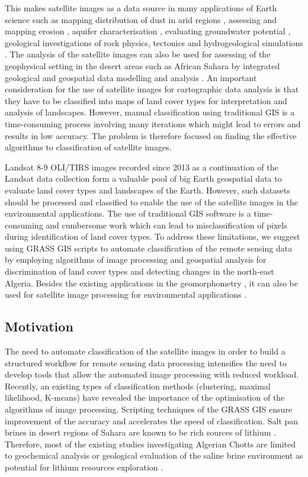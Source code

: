 \documentclass[asi,article,submit,pdftex,moreauthors]{Definitions/mdpi}
\begin{document}
This makes satellite images as a data source in many applications of Earth science such as mapping distribution of dust in arid regions \cite{Parajuli}, assessing and mapping erosion \cite{Mihi}, aquifer characterisation \cite{AOUDIA2020103920}, evaluating groundwater potential \cite{Derdour}, geological investigations of rock physics, tectonics and hydrogeological simulations \cite{NEDJRAOUI2021104348}. The analysis of the satellite images can also be used for assessing of the geophysical setting in the desert areas such as African Sahara by integrated geological and geospatial data modelling and analysis \cite{ZERROUK2017146}. An important consideration for the use of satellite images for cartographic data analysis is that they have to be classified into maps of land cover types for interpretation and analysis of landscapes. However, manual classification using traditional GIS is a time-consuming process involving many iterations which might lead to errors and results in low accuracy. The problem is therefore focused on finding the effective algorithms to classification of satellite images.

Landsat 8-9 OLI/TIRS images recorded since 2013 as a continuation of the Landsat data collection form a valuable pool of big Earth geospatial data to evaluate land cover types and landscapes of the Earth. However, such datasets should be processed and classified to enable the use of the satellite images in the environmental applications. The use of traditional GIS software is a time‐consuming and cumbersome work which can lead to misclassification of pixels during identification of land cover types. To address these limitations, we suggest using GRASS GIS scripts to automate classification of the remote sensing data by employing algorithms of image processing and geospatial analysis for discrimination of land cover types and detecting changes in the north-east Algeria. Besides the existing applications in the geomorphometry \cite{HOFIERKA2009387}, it can also be used for satellite image processing for environmental applications \cite{Lemenkova202125}.

\subsection{Motivation}

The need to automate classification of the satellite images in order to build a structured workflow for remote sensing data processing intensifies the need to develop tools that allow the automated image processing with reduced workload. Recently, an existing types of classification methods (clustering, maximal likelihood, K-means) have revealed the importance of the optimisation of the algorithms of image processing. Scripting techniques of the GRASS GIS ensure improvement of the accuracy and accelerates the speed of classification. Salt pan brines in desert regions of Sahara are known to be rich sources of lithium \cite{ZATOUT2020104566}. Therefore, most of the existing studies investigating Algerian Chotts are limited to geochemical analysis \cite{Hacini,Hacinietal2006,MOULLA201264} or geological evaluation of the saline brine environment as potential for lithium resources exploration \cite{KESLER201255,FLEXER20181188}. 
\end{document}

